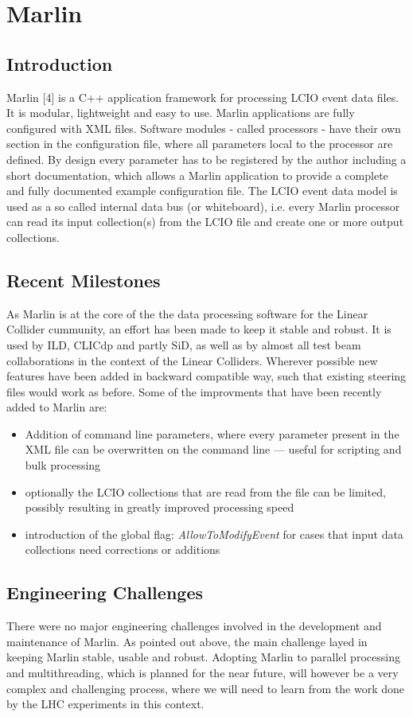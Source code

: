 \section{Marlin}

\subsection{Introduction}
Marlin [4] is a C++ application framework for processing LCIO event data files. It is modular, lightweight and easy to use. Marlin applications are fully configured with XML files. Software modules - called processors - have their own section in the configuration file, where all parameters local to the processor are defined. By design every parameter has to be registered by the author including a short documentation, which allows a Marlin application to provide a complete and fully documented example configuration file. The LCIO event data model is used as a so called internal data bus (or whiteboard), i.e. every Marlin processor can read its input collection(s) from the LCIO file and create one or more output collections.

\subsection{Recent Milestones}
As Marlin is at the core of the the data processing software for the Linear Collider cummunity, an effort has been made to keep it stable and robust. It is used by ILD, CLICdp and partly SiD, as well as by almost all test beam collaborations in the context of the Linear Colliders. Wherever possible new features have been added in backward compatible way, such that existing steering files would work as before. Some of the improvments that have been recently added to Marlin are:
\begin{itemize}
	\item Addition of command line parameters, where every parameter present in the XML file can be overwritten on the command line --- useful for scripting and bulk processing
	\item optionally the LCIO collections that are read from the file can be limited, possibly resulting in greatly improved processing speed
	\item introduction of the global flag: \emph{AllowToModifyEvent} for cases that input data collections need corrections or additions
\end{itemize}

\subsection{Engineering Challenges}
There were no major engineering challenges involved in the development and maintenance of Marlin. As pointed out above, the main challenge layed in keeping Marlin stable, usable and robust. Adopting Marlin to parallel processing and multithreading, which is planned for the near future, will however be a very complex and challenging process, where we will need to learn from the work done by the LHC experiments in this context.


